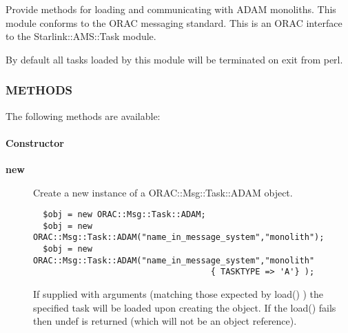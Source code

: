 Provide methods for loading and communicating with ADAM monoliths.
This module conforms to the ORAC messaging standard. This is an
ORAC interface to the Starlink::AMS::Task module.



By default all tasks loaded by this module will be terminated
on exit from perl.

\subsubsection*{METHODS\label{ORAC::Msg::Task::ADAM_METHODS}}

The following methods are available:

\paragraph*{Constructor\label{ORAC::Msg::Task::ADAM_Constructor}}\begin{description}
\item[\textbf{new}] \mbox{}

Create a new instance of a ORAC::Msg::Task::ADAM object.

\begin{verbatim}
  $obj = new ORAC::Msg::Task::ADAM;
  $obj = new ORAC::Msg::Task::ADAM("name_in_message_system","monolith");
  $obj = new ORAC::Msg::Task::ADAM("name_in_message_system","monolith"
                                    { TASKTYPE => 'A'} );
\end{verbatim}


If supplied with arguments (matching those expected by load() ) the
specified task will be loaded upon creating the object. If the load()
fails then undef is returned (which will not be an object reference).

\end{description}
